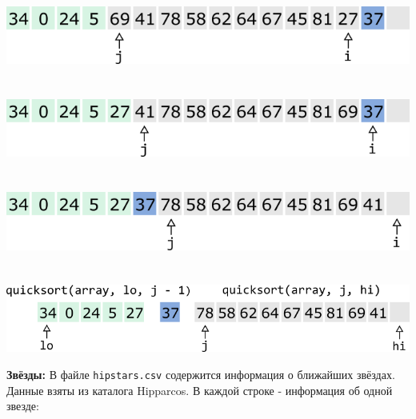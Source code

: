 \documentclass{article}
\begin{document}
\begin{multicols}{2}
\\
\\
\\
\includegraphics[scale=0.53]{../images/qs8.png}
\\
\\
\\
\includegraphics[scale=0.53]{../images/qs9.png}
\\
\\
\\
\includegraphics[scale=0.53]{../images/qs10.png}
\\
\\
\\
\includegraphics[scale=0.47]{../images/qs11.png}
\end{multicols}
\newpage
\textbf{Звёзды:} В файле \texttt{hipstars.csv} содержится информация о ближайших звёздах. Данные взяты из каталога Hipparcos. В каждой строке - информация об одной звезде:
\end{document}
